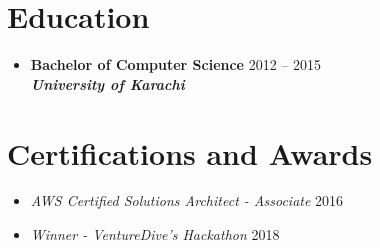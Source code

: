 \documentclass[a4paper,11pt]{article}
\begin{document}
\section*{Education}
\vspace{-0.6em}
\begin{itemize}[leftmargin=*]
    \item \textbf{Bachelor of Computer Science} \hfill 2012 -- 2015\\
    \textbf{\textit{University of Karachi}}
\end{itemize}


\section*{Certifications and Awards}
\vspace{-0.6em}
\begin{itemize}[leftmargin=*]
    \item \textit{AWS Certified Solutions Architect - Associate} \hfill 2016
    \item \textit{Winner - VentureDive's Hackathon} \hfill 2018
\end{itemize}
\end{document}
